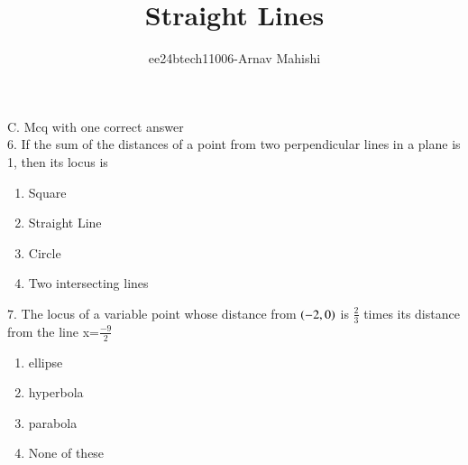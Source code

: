 \documentclass[journal,12pt,twocolumn]{IEEEtran}
\theoremstyle{remark}
\begin{document}

\vspace{3cm}

\title{Straight Lines}
\author{ee24btech11006-Arnav Mahishi}
\maketitle
\newpage
\bigskip

\renewcommand{\thefigure}{\theenumi}
\renewcommand{\thetable}{\theenumi}
C. Mcq with one correct answer\\

$6$. If the sum of the distances of a point from two perpendicular lines in a plane is 1, then its locus is \hfill{}
\begin{enumerate}[label=\alph*]
    \item Square
    \item Straight Line
    \item Circle
    \item Two intersecting lines
\end{enumerate}

$7$. The locus of a variable point whose distance from $\left(-2,0\right)$ is 
$\frac{2}{3}$ times its distance from the line x=$\frac{-9}{2}$ \hfill{}
\begin{enumerate}[label=\alph*]
    \item ellipse
    \item hyperbola
    \item parabola
    \item None of these
\end{enumerate}
\end{document}
